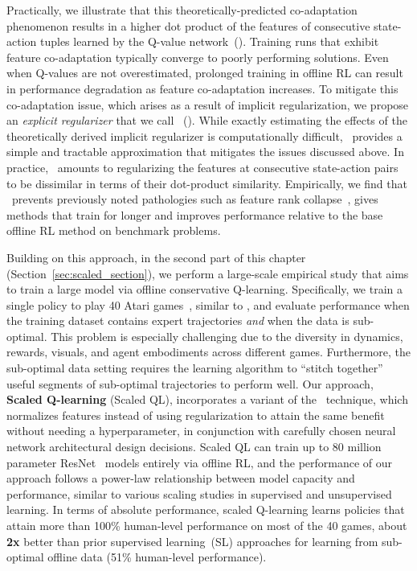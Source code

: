 Practically, we illustrate that this theoretically-predicted co-adaptation phenomenon results in a higher dot product of the features of consecutive state-action tuples learned by the Q-value network~(). Training runs that exhibit feature co-adaptation typically converge to poorly performing solutions. Even when Q-values are not overestimated, prolonged training in offline RL can result in performance degradation as feature co-adaptation increases. To mitigate this co-adaptation issue, which arises as a result of implicit regularization, we propose an \emph{explicit regularizer} that we call \drmethodname~(). While exactly estimating the effects of the theoretically derived implicit regularizer is computationally difficult, \drmethodname\ provides a simple and tractable approximation that mitigates the issues discussed above. In practice, \drmethodname\ amounts to regularizing the features at consecutive state-action pairs to be dissimilar in terms of their dot-product similarity. Empirically, we find that \drmethodname\ prevents previously noted pathologies such as feature rank collapse~\citep{kumar2021implicit}, gives methods that train for longer and improves performance relative to the base offline RL method on benchmark problems.

Building on this approach, in the second part of this chapter (Section~\ref{sec:scaled_section}), we perform a large-scale empirical study that aims to train a large model via offline conservative Q-learning. Specifically, we train a single policy to play 40 Atari games~\citep{bellemare2013arcade}, similar to \citet{lee2022multi}, and evaluate performance when the training dataset contains expert trajectories \emph{and} when the data is sub-optimal. This problem is especially challenging due to the diversity in dynamics, rewards, visuals, and agent embodiments across different games. Furthermore, the sub-optimal data setting requires the learning algorithm to ``stitch together'' useful segments of sub-optimal trajectories to perform well.
Our approach, \textbf{Scaled Q-learning} (Scaled QL), incorporates a variant of the \drmethodname\ technique, which normalizes features instead of using regularization to attain the same benefit without needing a hyperparameter, in conjunction with carefully chosen neural network architectural design decisions. Scaled QL can train up to 80 million parameter ResNet~\citep{resnet} models entirely via offline RL, and the performance of our approach follows a power-law relationship between model capacity and performance, similar to various scaling studies in supervised and unsupervised learning.
In terms of absolute performance, scaled Q-learning learns policies that attain more than 100\% human-level performance on most of the 40 games, about \textbf{2x} better than prior supervised learning~(SL) approaches for learning from sub-optimal offline data (51\% human-level performance).    

